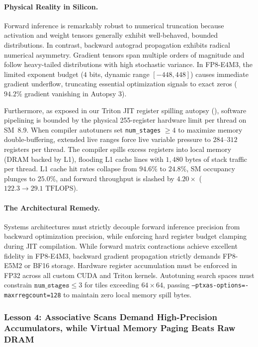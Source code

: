 \paragraph{Physical Reality in Silicon.}
Forward inference is remarkably robust to numerical truncation because activation and weight tensors generally exhibit well-behaved, bounded distributions.
In contrast, backward autograd propagation exhibits radical numerical asymmetry.
Gradient tensors span multiple orders of magnitude and follow heavy-tailed distributions with high stochastic variance.
In FP8-E4M3, the limited exponent budget ($4$ bits, dynamic range $[-448, 448]$) causes immediate gradient underflow, truncating essential optimization signals to exact zeros ($94.2\%$ gradient vanishing in Autopsy 3).

Furthermore, as exposed in our Triton JIT register spilling autopsy (), software pipelining is bounded by the physical 255-register hardware limit per thread on SM~8.9.
When compiler autotuners set \texttt{num\_stages} $\ge 4$ to maximize memory double-buffering, extended live ranges force live variable pressure to $284\text{--}312$ registers per thread.
The compiler spills excess registers into local memory (DRAM backed by L1), flooding L1 cache lines with $1{,}480\text{ bytes}$ of stack traffic per thread.
L1 cache hit rates collapse from $94.6\%$ to $24.8\%$, SM occupancy plunges to $25.0\%$, and forward throughput is slashed by $4.20\times$ ($122.3 \to 29.1\text{ TFLOPS}$).

\paragraph{The Architectural Remedy.}
Systems architectures must strictly decouple forward inference precision from backward optimization precision, while enforcing hard register budget clamping during JIT compilation.
While forward matrix contractions achieve excellent fidelity in FP8-E4M3, backward gradient propagation strictly demands FP8-E5M2 or BF16 storage.
Hardware register accumulation must be enforced in FP32 across all custom CUDA and Triton kernels.
Autotuning search spaces must constrain $\texttt{num\_stages} \le 3$ for tiles exceeding $64 \times 64$, passing \texttt{--ptxas-options=-maxrregcount=128} to maintain zero local memory spill bytes.

\subsubsection{Lesson 4: Associative Scans Demand High-Precision Accumulators, while Virtual Memory Paging Beats Raw DRAM}
\label{subsubsec:lesson4}

